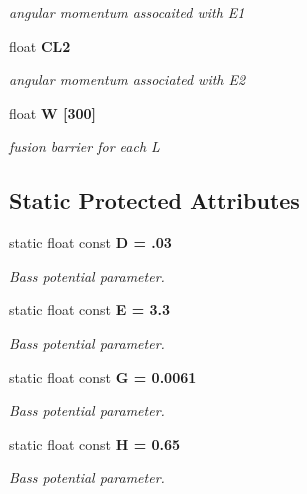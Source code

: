 \begin{CompactItemize}
\begin{CompactList}\small\item\em angular momentum assocaited with E1 \item\end{CompactList}\item 
float \bf{CL2}\label{classCFus_7ea03c5268cadd99a70a0d8344cd84fa}

\begin{CompactList}\small\item\em angular momentum associated with E2 \item\end{CompactList}\item 
float \bf{W} [300]\label{classCFus_5503869eae8c9e901751cb7a16fc5e46}

\begin{CompactList}\small\item\em fusion barrier for each L \item\end{CompactList}\end{CompactItemize}
\subsection*{Static Protected Attributes}
\begin{CompactItemize}
\item 
static float const \bf{D} = .03\label{classCFus_591beeea1086361d595781367644f94e}

\begin{CompactList}\small\item\em Bass potential parameter. \item\end{CompactList}\item 
static float const \bf{E} = 3.3\label{classCFus_7c9a507cbd29aee60dcaaae0b1c4bd24}

\begin{CompactList}\small\item\em Bass potential parameter. \item\end{CompactList}\item 
static float const \bf{G} = 0.0061\label{classCFus_f9a9e49c100e6c74ac99b44ec4264c0c}

\begin{CompactList}\small\item\em Bass potential parameter. \item\end{CompactList}\item 
static float const \bf{H} = 0.65\label{classCFus_08ab0f3682444529c29ec8e45c8d6cdd}

\begin{CompactList}\small\item\em Bass potential parameter. \item\end{CompactList}\end{CompactItemize}


